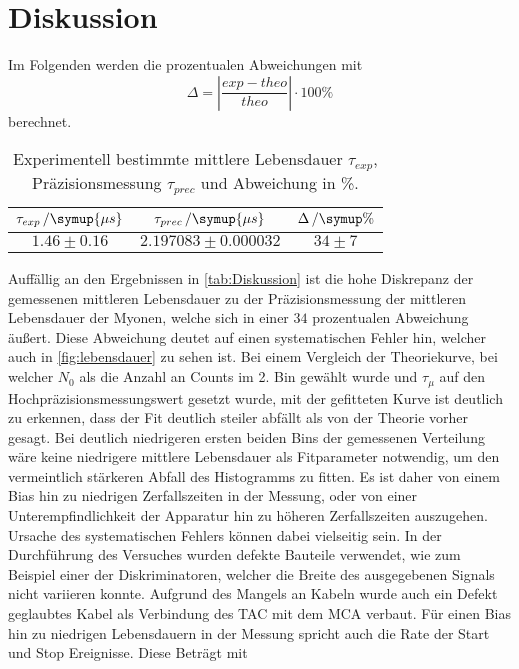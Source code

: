 \section{Diskussion}
\label{sec:Diskussion}
Im Folgenden werden die prozentualen Abweichungen mit 
\begin{equation}\label{eq:1}
    \Delta = |\frac{exp - theo}{theo}|\cdot 100\%
\end{equation}
berechnet.

\begin{table}[H]
    \centering
    \caption{Experimentell bestimmte mittlere Lebensdauer $\tau_{exp}$, Präzisionsmessung $\tau_{prec}$ und Abweichung in \%.}
    \begin{tabular}{c c c}
        \toprule
        {$\tau_{exp}\,/\symup{\mu s}$} & {$\tau_{prec}\,/\symup{\mu s}$ \cite{pdg}} & {$\Delta\,/\symup{\%}$}\\
        \midrule
        $1.46 \pm 0.16$ & $2.197083 \pm 0.000032$ & $34 \pm 7$ \\
        \bottomrule
    \end{tabular}
    \label{tab:Diskussion}
\end{table}
Auffällig an den Ergebnissen in \autoref{tab:Diskussion} ist die hohe Diskrepanz der gemessenen mittleren Lebensdauer zu der Präzisionsmessung der mittleren Lebensdauer der Myonen, welche sich in einer $34$ prozentualen Abweichung äußert.
Diese Abweichung deutet auf einen systematischen Fehler hin, welcher auch in \autoref{fig:lebensdauer} zu sehen ist. Bei einem Vergleich der Theoriekurve, bei welcher $N_0$ als die Anzahl an Counts im 2. Bin gewählt wurde und $\tau_\mu$ auf den Hochpräzisionsmessungswert gesetzt wurde, mit der gefitteten Kurve ist deutlich zu erkennen, dass der Fit deutlich steiler abfällt als von der Theorie vorher gesagt.
Bei deutlich niedrigeren ersten beiden Bins der gemessenen Verteilung wäre keine niedrigere mittlere Lebensdauer als Fitparameter notwendig, um den vermeintlich stärkeren Abfall des Histogramms zu fitten. Es ist daher von einem Bias hin zu niedrigen Zerfallszeiten in der Messung, oder von einer Unterempfindlichkeit der Apparatur hin zu höheren Zerfallszeiten auszugehen. Ursache des systematischen Fehlers können dabei vielseitig sein. In der Durchführung des Versuches wurden defekte Bauteile verwendet, wie zum Beispiel einer der Diskriminatoren, welcher die Breite des ausgegebenen Signals nicht variieren konnte. Aufgrund des Mangels an Kabeln wurde auch ein Defekt geglaubtes Kabel als Verbindung des TAC mit dem MCA verbaut.
Für einen Bias hin zu niedrigen Lebensdauern in der Messung spricht auch die Rate der Start und Stop Ereignisse. Diese Beträgt mit
